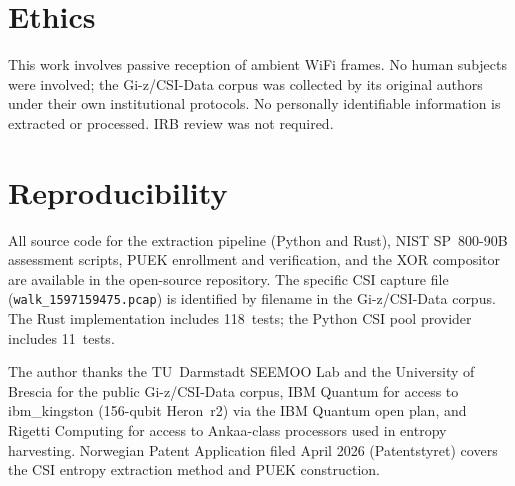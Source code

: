 \documentclass[sigconf,nonacm=false]{acmart}
\begin{document}
\section*{Ethics}
This work involves passive reception of ambient WiFi frames.
No human subjects were involved; the Gi-z/CSI-Data corpus was collected by its original authors under their own institutional protocols.
No personally identifiable information is extracted or processed.
IRB review was not required.

\section*{Reproducibility}
All source code for the extraction pipeline (Python and Rust), NIST SP~800-90B assessment scripts, PUEK enrollment and verification, and the XOR compositor are available in the open-source repository.
The specific CSI capture file (\texttt{walk\_1597159475.pcap}) is identified by filename in the Gi-z/CSI-Data corpus.
The Rust implementation includes 118~tests; the Python CSI pool provider includes 11~tests.

\begin{acks}
The author thanks the TU~Darmstadt SEEMOO Lab and the University of Brescia for the public Gi-z/CSI-Data corpus, IBM Quantum for access to ibm\_kingston (156-qubit Heron~r2) via the IBM Quantum open plan, and Rigetti Computing for access to Ankaa-class processors used in entropy harvesting. Norwegian Patent Application filed April 2026 (Patentstyret) covers the CSI entropy extraction method and PUEK construction.
\end{acks}



\end{document}
